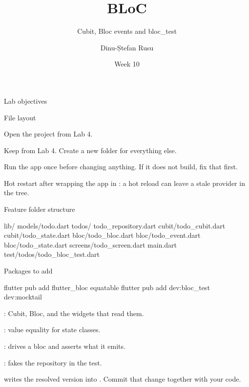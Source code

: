 \documentclass[10pt,aspectratio=169,t]{beamer}
\title{BLoC}
\subtitle{Cubit, Bloc events and bloc\_test}
\author{Dinu-Ștefan Rusu}
\date{Week 10}
\begin{document}
\titleframe

\begin{frame}[eyebrow=Today]{Lab objectives}
  \vskip 2mm
  \begin{grid}[2]
  \end{grid}
  \vskip 6mm
\end{frame}

\begin{frame}[fragile,eyebrow=Setup]{File layout}
  \begin{steps}
    \item Open the project from Lab 4.
    \item Keep  from Lab 4. Create a new  folder for everything else.
    \item Run the app once before changing anything. If it does not build, fix that first.
  \end{steps}
  \begin{hint}
    Hot restart after wrapping the app in : a hot reload can leave a stale provider in the tree.
  \end{hint}
\end{frame}

\begin{frame}[fragile,eyebrow=Setup]{Feature folder structure}
  \begin{codeblock}
lib/
  models/todo.dart
  todos/
    todo_repository.dart
    cubit/todo_cubit.dart
    cubit/todo_state.dart
    bloc/todo_bloc.dart
    bloc/todo_event.dart
    bloc/todo_state.dart
  screens/todo_screen.dart
  main.dart
test/todos/todo_bloc_test.dart
  \end{codeblock}
\end{frame}

\begin{frame}[fragile,eyebrow=Setup]{Packages to add}
\begin{shell}
flutter pub add flutter_bloc equatable
flutter pub add dev:bloc_test dev:mocktail
\end{shell}
  \begin{steps}
    \item {}: Cubit, Bloc, and the widgets that read them.
    \item {}: value equality for state classes.
    \item {}: drives a bloc and asserts what it emits.
    \item {}: fakes the repository in the test.
  \end{steps}
  \begin{hint}
     writes the resolved version into . Commit that change together with your code.
  \end{hint}
\end{frame}
\end{document}
